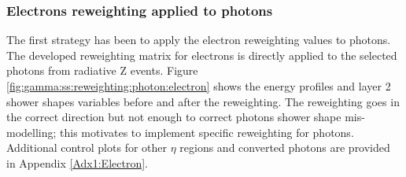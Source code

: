 \subsubsection{Electrons reweighting applied to photons}
The first strategy has been to apply the electron reweighting values to photons. The developed reweighting matrix for electrons is directly applied to the selected photons from radiative Z events. Figure \ref{fig:gamma:ss:reweighting:photon:electron} shows the energy profiles and layer 2 shower shapes variables before and after the reweighting. The reweighting goes in the correct direction but not enough to correct photons shower shape mis-modelling; this motivates to implement specific reweighting for photons. Additional control plots for other $\eta$ regions and converted photons are provided in Appendix \ref{Adx1:Electron}.
\begin{figure}[htbp]
    \centering
	 \\

\end{figure}
